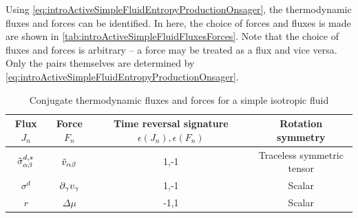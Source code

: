 Using \autoref{eq:introActiveSimpleFluidEntropyProductionOnsager}, the thermodynamic fluxes and forces can be identified. In here, the choice of forces and fluxes is made are shown in \autoref{tab:introActiveSimpleFluidFluxesForces}. Note that the choice of fluxes and forces is arbitrary -- a force may be treated as a flux and vice versa. Only the pairs themselves are determined by \autoref{eq:introActiveSimpleFluidEntropyProductionOnsager}.
\begin{table}[h]
    \centering
    \begin{tabular}{|c|c|c|c|}
        \hline
        Flux $J_n$ & Force $F_n$ & Time reversal signature $\epsilon(J_n), \epsilon(F_n)$ & Rotation symmetry\\
        \hline
        $\Tilde{\sigma}^{d,s}_{\alpha\beta}$ & $\Tilde{v}_{\alpha\beta}$ & 1,-1 & Traceless symmetric tensor\\
        $\sigma^d$ & $\inlinePartial{\gamma}v_\gamma$ & 1,-1 & Scalar \\
        $r$ & $\Delta \mu$ & -1,1 & Scalar \\
        \hline
    \end{tabular}
    \caption{Conjugate thermodynamic fluxes and forces for a simple isotropic fluid}
    \label{tab:introActiveSimpleFluidFluxesForces}
\end{table}

